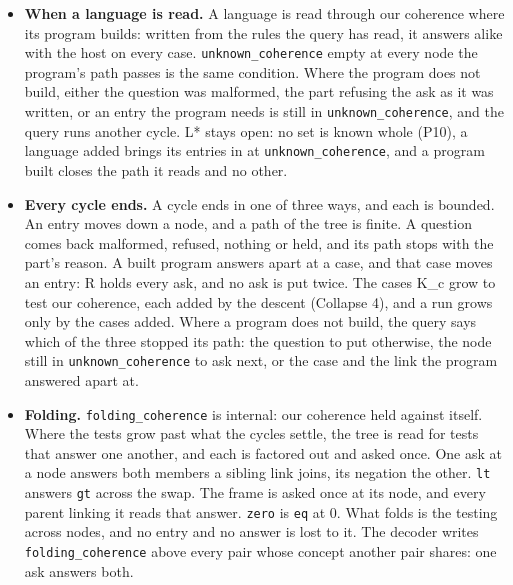 \begin{itemize}
\item \textbf{When a language is read.} A language is read through our coherence where its program builds: written from the rules the query has read, it answers alike with the host on every case. \texttt{unknown\_\allowbreak{}coherence} empty at every node the program's path passes is the same condition. Where the program does not build, either the question was malformed, the part refusing the ask as it was written, or an entry the program needs is still in \texttt{unknown\_\allowbreak{}coherence}, and the query runs another cycle. L* stays open: no set is known whole (P10), a language added brings its entries in at \texttt{unknown\_\allowbreak{}coherence}, and a program built closes the path it reads and no other.
\item \textbf{Every cycle ends.} A cycle ends in one of three ways, and each is bounded. An entry moves down a node, and a path of the tree is finite. A question comes back malformed, refused, nothing or held, and its path stops with the part's reason. A built program answers apart at a case, and that case moves an entry: R holds every ask, and no ask is put twice. The cases K\_\allowbreak{}c grow to test our coherence, each added by the descent (Collapse 4), and a run grows only by the cases added. Where a program does not build, the query says which of the three stopped its path: the question to put otherwise, the node still in \texttt{unknown\_\allowbreak{}coherence} to ask next, or the case and the link the program answered apart at.
\item \textbf{Folding.} \texttt{folding\_\allowbreak{}coherence} is internal: our coherence held against itself. Where the tests grow past what the cycles settle, the tree is read for tests that answer one another, and each is factored out and asked once. One ask at a node answers both members a sibling link joins, its negation the other. \texttt{lt} answers \texttt{gt} across the swap. The frame is asked once at its node, and every parent linking it reads that answer. \texttt{zero} is \texttt{eq} at 0. What folds is the testing across nodes, and no entry and no answer is lost to it. The decoder writes \texttt{folding\_\allowbreak{}coherence} above every pair whose concept another pair shares: one ask answers both.

\end{itemize}
